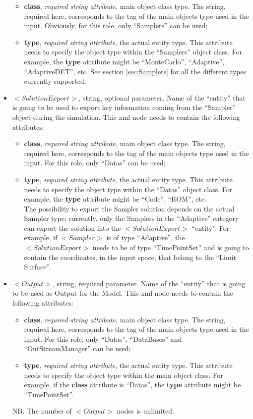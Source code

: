 \begin{itemize}
\begin{itemize}
  \item \textbf{class}, \textit{required string attribute}, main object class type. The string, required here, corresponds to the tag of the main objects type used in the input. Obviously, for this role, only ``Samplers'' can be used;
  \item \textbf{type}, \textit{required string attribute}, the actual entity type. This attribute needs to specify the object type within the ``Samplers'' object class. For example, the \textbf{type} attribute might be ``MonteCarlo'', ``Adaptive'', ``AdaptiveDET'', etc. See section \ref{sec:Samplers} for all the different types currently supported.
\end{itemize}
\item $<SolutionExport>$, string, optional parameter. Name of the ``entity'' that is going to be used to export key information coming from the ``Sampler'' object during the simulation. This xml node needs to contain the following attributes:
\begin{itemize}
  \item \textbf{class}, \textit{required string attribute}, main object class type. The string, required here, corresponds to the tag of the main objects type used in the input. For this role, only ``Datas'' can be used;
  \item \textbf{type}, \textit{required string attribute}, the actual entity type. This attribute needs to specify the object type within the ``Datas'' object class. For example, the \textbf{type} attribute might be ``Code'', ``ROM'', etc. 
\\The possibility to export the Sampler solution depends on the actual Sampler type; currently, only the Samplers in the ``Adaptive'' category can export the solution into the $<SolutionExport>$ ``entity''. For example, if  $<Sampler>$ is of type ``Adaptive'', the $<SolutionExport>$ needs to be of type ``TimePointSet'' and is going to contain the coordinates, in the input space, that belong to the ``Limit Surface''. 
\end{itemize}
\item $<Output>$, string, required parameter. Name of the ``entity'' that is going to be used as Output for the Model. This xml node needs to contain the following attributes:
\begin{itemize}
  \item \textbf{class}, \textit{required string attribute}, main object class type. The string, required here, corresponds to the tag of the main objects type used in the input. For this role, only ``Datas'', ``DataBases'' and ``OutStreamManager'' can be used;
  \item \textbf{type}, \textit{required string attribute}, the actual entity type. This attribute needs to specify the object type within the main object class. For example, if the  \textbf{class} attribute is ``Datas'', the \textbf{type} attribute might be ``TimePointSet''.
\end{itemize}
NB. The number of $<Output>$ nodes is unlimited.
\end{itemize}


